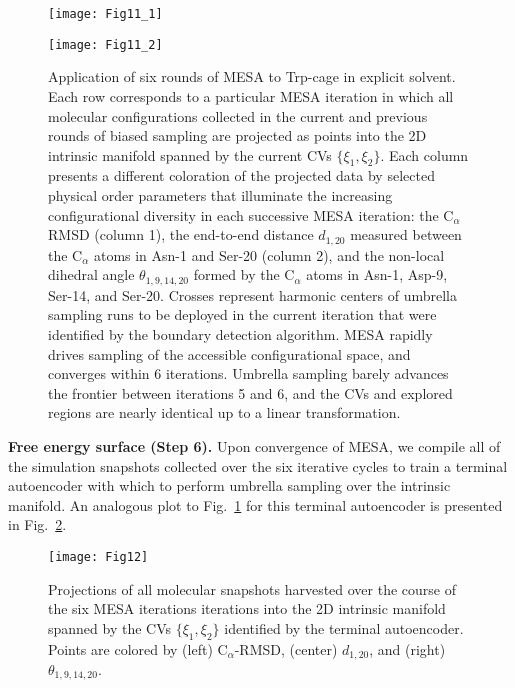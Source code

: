 \documentclass[12pt]{article}
\newcommand*{\blauw}[1]{#1}
\begin{document}
\begin{figure}[ht!]
\begin{center}
\texttt{[image: Fig11\_1]} 
\end{center}
\end{figure}

\clearpage
\newpage

\begin{figure}[ht!]
\begin{center}
\texttt{[image: Fig11\_2]} 
\caption{Application of six rounds of MESA to Trp-cage in explicit solvent. Each row corresponds to a particular MESA iteration in which all molecular configurations collected in the current and previous rounds of biased sampling are projected as points into the 2D intrinsic manifold spanned by the current CVs $\{\xi_1,\xi_2\}$. Each column presents a different coloration of the projected data by selected physical order parameters that illuminate the increasing configurational diversity in each successive MESA iteration: the $\mathrm{C}_\alpha$ RMSD (column 1), the end-to-end distance $d_{1,20}$ measured between the $\mathrm{C}_\alpha$ atoms in Asn-1 and Ser-20 (column 2), and the non-local dihedral angle $\theta_{1,9,14,20}$ formed by the $\mathrm{C}_\alpha$ atoms in Asn-1, Asp-9, Ser-14, and Ser-20. Crosses represent harmonic centers of umbrella sampling runs to be deployed in the current iteration that were identified by the boundary detection algorithm. MESA rapidly drives sampling of the accessible configurational space, and converges within 6 iterations. Umbrella sampling barely advances the frontier between iterations 5 and 6, and the CVs and explored regions are nearly identical up to a linear transformation.} \label{Trp_cage_series}
\end{center}
\end{figure}

\textbf{Free energy surface (Step 6).} Upon convergence of MESA, we compile all of the simulation snapshots collected over the six iterative cycles to train a terminal autoencoder with which to perform umbrella sampling over the intrinsic manifold. An analogous plot to \blauw{Fig.~\ref{Trp_cage_series}} for this terminal autoencoder is presented in \blauw{Fig.~\ref{Trp_WHAM}}. 

\begin{figure}[ht!]
\begin{center}
\texttt{[image: Fig12]} 
\caption{Projections of all molecular snapshots harvested over the course of the six MESA iterations iterations into the 2D intrinsic manifold spanned by the CVs $\{\xi_1,\xi_2\}$ identified by the terminal autoencoder. Points are colored by (left) $\mathrm{C}_\alpha$-RMSD, (center) $d_{1,20}$, and (right) $\theta_{1,9,14,20}$. }
\label{Trp_WHAM}
\end{center}
\end{figure}
\end{document}
